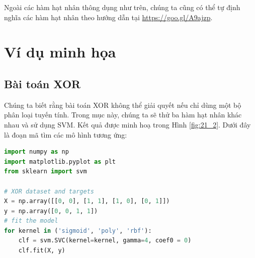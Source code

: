 Ngoài các hàm hạt nhân thông dụng như trên, chúng ta cũng có thể tự định nghĩa các
hàm hạt nhân theo hướng dẫn tại \url{https://goo.gl/A9ajzp}.

\section{Ví dụ minh họa}


\subsection{Bài toán XOR}
Chúng ta biết rằng bài toán XOR không
thể giải quyết nếu chỉ dùng một bộ phân loại tuyến tính. Trong mục này, chúng ta sẽ thử ba hàm hạt nhân khác nhau và sử dụng SVM. Kết quả được minh hoạ trong Hình \ref{fig:21_2}. Dưới đây là đoạn mã tìm các mô hình tương ứng:

\begin{lstlisting}[language=Python]
import numpy as np
import matplotlib.pyplot as plt
from sklearn import svm

# XOR dataset and targets
X = np.array([[0, 0], [1, 1], [1, 0], [0, 1]])
y = np.array([0, 0, 1, 1])
# fit the model
for kernel in ('sigmoid', 'poly', 'rbf'):
    clf = svm.SVC(kernel=kernel, gamma=4, coef0 = 0)
    clf.fit(X, y)
\end{lstlisting}
%

